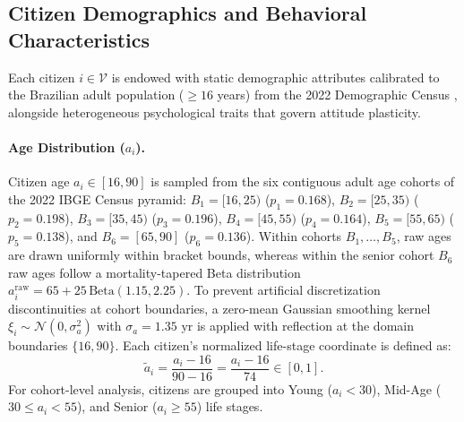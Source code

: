 \subsection{Citizen Demographics and Behavioral Characteristics}
\label{subsec:demographics_traits}

Each citizen $i \in \mathcal{V}$ is endowed with static demographic attributes calibrated to the Brazilian adult population ($\ge 16$ years) from the 2022 Demographic Census \citep{ibge2022censo}, alongside heterogeneous psychological traits that govern attitude plasticity.

\paragraph{Age Distribution ($a_i$).}
Citizen age $a_i \in [16, 90]$ is sampled from the six contiguous adult age cohorts of the 2022 IBGE Census pyramid: $B_1 = [16, 25)$ ($p_1 = 0.168$), $B_2 = [25, 35)$ ($p_2 = 0.198$), $B_3 = [35, 45)$ ($p_3 = 0.196$), $B_4 = [45, 55)$ ($p_4 = 0.164$), $B_5 = [55, 65)$ ($p_5 = 0.138$), and $B_6 = [65, 90]$ ($p_6 = 0.136$). Within cohorts $B_1, \dots, B_5$, raw ages are drawn uniformly within bracket bounds, whereas within the senior cohort $B_6$ raw ages follow a mortality-tapered Beta distribution $a_i^{\mathrm{raw}} = 65 + 25\,\mathrm{Beta}(1.15, 2.25)$. To prevent artificial discretization discontinuities at cohort boundaries, a zero-mean Gaussian smoothing kernel $\xi_i \sim \mathcal{N}(0, \sigma_a^2)$ with $\sigma_a = 1.35\text{ yr}$ is applied with reflection at the domain boundaries $\{16, 90\}$. Each citizen's normalized life-stage coordinate is defined as:
\begin{equation}
    \tilde{a}_i = \frac{a_i - 16}{90 - 16} = \frac{a_i - 16}{74} \in [0, 1].
    \label{eq:age_norm}
\end{equation}
For cohort-level analysis, citizens are grouped into Young ($a_i < 30$), Mid-Age ($30 \le a_i < 55$), and Senior ($a_i \ge 55$) life stages.

